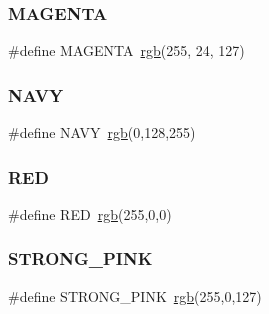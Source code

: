 \subsubsection{\texorpdfstring{M\+A\+G\+E\+N\+TA}{MAGENTA}}
{\footnotesize\ttfamily \#define M\+A\+G\+E\+N\+TA~\hyperlink{group__video__gr_gafcc897567998ed3a26974926501a4abd}{rgb}(255, 24, 127)}

\hypertarget{group__video__gr_gab2ee9bdede8e3af96ff696c7b2ba7416}{}\label{group__video__gr_gab2ee9bdede8e3af96ff696c7b2ba7416} 
\subsubsection{\texorpdfstring{N\+A\+VY}{NAVY}}
{\footnotesize\ttfamily \#define N\+A\+VY~\hyperlink{group__video__gr_gafcc897567998ed3a26974926501a4abd}{rgb}(0,128,255)}

\hypertarget{group__video__gr_ga8d23feea868a983c8c2b661e1e16972f}{}\label{group__video__gr_ga8d23feea868a983c8c2b661e1e16972f} 
\subsubsection{\texorpdfstring{R\+ED}{RED}}
{\footnotesize\ttfamily \#define R\+ED~\hyperlink{group__video__gr_gafcc897567998ed3a26974926501a4abd}{rgb}(255,0,0)}

\hypertarget{group__video__gr_ga1dd918deb1dda207fd2665e93b575e36}{}\label{group__video__gr_ga1dd918deb1dda207fd2665e93b575e36} 
\subsubsection{\texorpdfstring{S\+T\+R\+O\+N\+G\+\_\+\+P\+I\+NK}{STRONG\_PINK}}
{\footnotesize\ttfamily \#define S\+T\+R\+O\+N\+G\+\_\+\+P\+I\+NK~\hyperlink{group__video__gr_gafcc897567998ed3a26974926501a4abd}{rgb}(255,0,127)}

\hypertarget{group__video__gr_gad2cbbe762a1a1175055cf68cd586adc1}{}\label{group__video__gr_gad2cbbe762a1a1175055cf68cd586adc1} 
